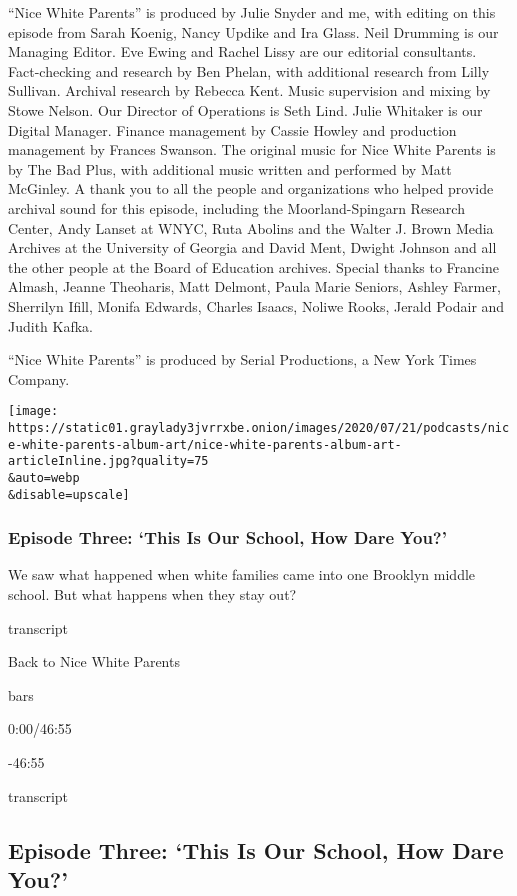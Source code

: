 ``Nice White Parents'' is produced by Julie Snyder and me, with editing
on this episode from Sarah Koenig, Nancy Updike and Ira Glass. Neil
Drumming is our Managing Editor. Eve Ewing and Rachel Lissy are our
editorial consultants. Fact-checking and research by Ben Phelan, with
additional research from Lilly Sullivan. Archival research by Rebecca
Kent. Music supervision and mixing by Stowe Nelson. Our Director of
Operations is Seth Lind. Julie Whitaker is our Digital Manager. Finance
management by Cassie Howley and production management by Frances
Swanson. The original music for Nice White Parents is by The Bad Plus,
with additional music written and performed by Matt McGinley. A thank
you to all the people and organizations who helped provide archival
sound for this episode, including the Moorland-Spingarn Research Center,
Andy Lanset at WNYC, Ruta Abolins and the Walter J. Brown Media Archives
at the University of Georgia and David Ment, Dwight Johnson and all the
other people at the Board of Education archives. Special thanks to
Francine Almash, Jeanne Theoharis, Matt Delmont, Paula Marie Seniors,
Ashley Farmer, Sherrilyn Ifill, Monifa Edwards, Charles Isaacs, Noliwe
Rooks, Jerald Podair and Judith Kafka.

``Nice White Parents'' is produced by Serial Productions, a New York
Times Company.

\texttt{[image: https://static01.graylady3jvrrxbe.onion/images/2020/07/21/podcasts/nice-white-parents-album-art/nice-white-parents-album-art-articleInline.jpg?quality=75\\\&auto=webp\\\&disable=upscale]}

\hypertarget{episode-three-this-is-our-school-how-dare-you}{%
\subsubsection{Episode Three: `This Is Our School, How Dare
You?'}\label{episode-three-this-is-our-school-how-dare-you}}

We saw what happened when white families came into one Brooklyn middle
school. But what happens when they stay out?

transcript

Back to Nice White Parents

bars

0:00/46:55

-46:55

transcript

\hypertarget{episode-three-this-is-our-school-how-dare-you-1}{%
\subsection{Episode Three: `This Is Our School, How Dare
You?'}\label{episode-three-this-is-our-school-how-dare-you-1}}

